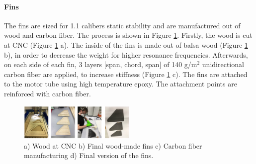 
\paragraph{Fins}
\hfill \break
    The fins are sized for 1.1 calibers static stability %
    and are manufactured out of wood and carbon fiber. 
    The process is shown in Figure \ref{f:fins}. Firstly, the wood is cut at CNC (Figure \ref{f:fins} a). The inside of the fins is made out of balsa wood (Figure \ref{f:fins} b), in order to decrease the weight for higher resonance frequencies. Afterwards, on each side of each fin, 3 layers [span, chord, span] of 140 g/m$^2$ unidirectional carbon fiber are applied, to increase stiffness (Figure \ref{f:fins} c). The fins are attached to the motor tube using high temperature epoxy. The attachment points are reinforced with carbon fiber.
    \begin{figure}[h!]
        \centering
        \includegraphics[width=0.5\textwidth]{img/fins.jpg}
        \caption{a) Wood at CNC b) Final wood-made fins c) Carbon fiber manufacturing d) Final version of the fins.}
        \label{f:fins}
    \end{figure}


